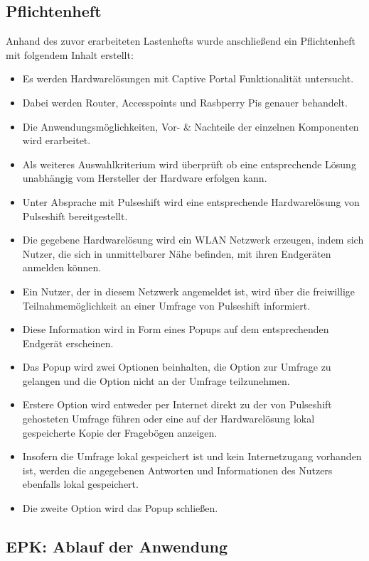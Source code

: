 \subsection{Pflichtenheft}
Anhand des zuvor erarbeiteten Lastenhefts wurde anschließend ein Pflichtenheft mit folgendem Inhalt erstellt:
\begin{itemize}
\item Es werden Hardwarelösungen mit Captive Portal Funktionalität untersucht.
\item Dabei werden Router, Accesspoints und Rasbperry Pis genauer behandelt.
\item Die Anwendungsmöglichkeiten, Vor- \& Nachteile der einzelnen Komponenten wird erarbeitet.
\item Als weiteres Auswahlkriterium wird überprüft ob eine entsprechende Lösung unabhängig vom Hersteller der Hardware erfolgen kann.
\item Unter Absprache mit Pulseshift wird eine entsprechende Hardwarelösung von Pulseshift bereitgestellt.
\item Die gegebene Hardwarelösung wird ein WLAN Netzwerk erzeugen, indem sich Nutzer, die sich in unmittelbarer Nähe befinden, mit ihren Endgeräten anmelden können.
\item Ein Nutzer, der in diesem Netzwerk angemeldet ist, wird über die freiwillige Teilnahmemöglichkeit an einer Umfrage von Pulseshift informiert.
\item Diese Information wird in Form eines Popups auf dem entsprechenden Endgerät erscheinen.
\item Das Popup wird zwei Optionen beinhalten, die Option zur Umfrage zu gelangen und die Option nicht an der Umfrage teilzunehmen.
\item Erstere Option wird entweder per Internet direkt zu der von Pulseshift gehosteten Umfrage führen oder eine auf der Hardwarelösung lokal gespeicherte Kopie der Fragebögen anzeigen.
\item Insofern die Umfrage lokal gespeichert ist und kein Internetzugang vorhanden ist, werden die angegebenen Antworten und Informationen des Nutzers ebenfalls lokal gespeichert.
\item Die zweite Option wird das Popup schließen.
\end{itemize}

\subsection{EPK: Ablauf der Anwendung}

